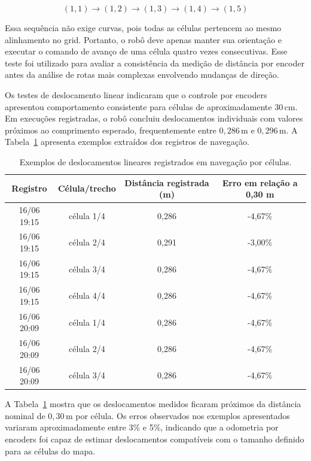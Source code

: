 \documentclass[	12pt, Times, openright, twoside, a4paper, english, brazil]{abntex2}
\begin{document}
\begin{equation}
	(1,1) \rightarrow (1,2) \rightarrow (1,3) \rightarrow (1,4) \rightarrow (1,5)
	\label{eq:rota_deslocamento_linear}
\end{equation}

Essa sequência não exige curvas, pois todas as células pertencem ao mesmo alinhamento no grid. Portanto, o robô deve apenas manter sua orientação e executar o comando de avanço de uma célula quatro vezes consecutivas. Esse teste foi utilizado para avaliar a consistência da medição de distância por encoder antes da análise de rotas mais complexas envolvendo mudanças de direção.

Os testes de deslocamento linear indicaram que o controle por encoders apresentou comportamento consistente para células de aproximadamente \(30\,\text{cm}\). Em execuções registradas, o robô concluiu deslocamentos individuais com valores próximos ao comprimento esperado, frequentemente entre \(0{,}286\,\text{m}\) e \(0{,}296\,\text{m}\). A Tabela~\ref{tab:deslocamento-celulas} apresenta exemplos extraídos dos registros de navegação.

\begin{table}[H]
	\centering
	\caption{Exemplos de deslocamentos lineares registrados em navegação por células.}
	\label{tab:deslocamento-celulas}
	\begin{tabular}{c c c c}
		\hline
		\textbf{Registro} & \textbf{Célula/trecho} & \textbf{Distância registrada (m)} & \textbf{Erro em relação a 0,30 m} \\
		\hline
		16/06 19:15 & célula 1/4 & 0,286 & -4,67\% \\
		16/06 19:15 & célula 2/4 & 0,291 & -3,00\% \\
		16/06 19:15 & célula 3/4 & 0,286 & -4,67\% \\
		16/06 19:15 & célula 4/4 & 0,286 & -4,67\% \\
		16/06 20:09 & célula 1/4 & 0,286 & -4,67\% \\
		16/06 20:09 & célula 2/4 & 0,286 & -4,67\% \\
		16/06 20:09 & célula 3/4 & 0,286 & -4,67\% \\
		\hline
	\end{tabular}
\end{table}

A Tabela~\ref{tab:deslocamento-celulas} mostra que os deslocamentos medidos ficaram próximos da distância nominal de \(0{,}30\,\text{m}\) por célula. Os erros observados nos exemplos apresentados variaram aproximadamente entre 3\% e 5\%, indicando que a odometria por encoders foi capaz de estimar deslocamentos compatíveis com o tamanho definido para as células do mapa.
\end{document}
